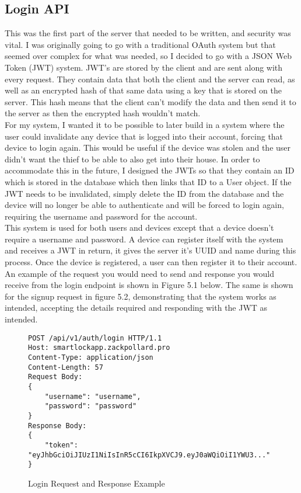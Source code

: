\subsection{Login API}
This was the first part of the server that needed to be written, and security was vital. I was originally going to go with a traditional OAuth system but that seemed over complex for what was needed, so I decided to go with a JSON Web Token (JWT) system. JWT's are stored by the client and are sent along with every request. They contain data that both the client and the server can read, as well as an encrypted hash of that same data using a key that is stored on the server. This hash means that the client can't modify the data and then send it to the server as then the encrypted hash wouldn't match. 
\\
\indent For my system, I wanted it to be possible to later build in a system where the user could invalidate any device that is logged into their account, forcing that device to login again. This would be useful if the device was stolen and the user didn't want the thief to be able to also get into their house. In order to accommodate this in the future, I designed the JWTs so that they contain an ID which is stored in the database which then links that ID to a User object. If the JWT needs to be invalidated, simply delete the ID from the database and the device will no longer be able to authenticate and will be forced to login again, requiring the username and password for the account.
\\
\indent This system is used for both users and devices except that a device doesn't require a username and password. A device can register itself with the system and receives a JWT in return, it gives the server it's UUID and name during this process. Once the device is registered, a user can then register it to their account. An example of the request you would need to send and response you would receive from the login endpoint is shown in Figure 5.1 below. The same is shown for the signup request in figure 5.2, demonstrating that the system works as intended, accepting the details required and responding with the JWT as intended.
\begin{figure}[H]
	\caption{Login Request and Response Example}
		\begin{Verbatim}[frame=single]
POST /api/v1/auth/login HTTP/1.1
Host: smartlockapp.zackpollard.pro
Content-Type: application/json
Content-Length: 57
Request Body:
{
	"username": "username",
	"password": "password"
}
Response Body:
{
	"token": "eyJhbGciOiJIUzI1NiIsInR5cCI6IkpXVCJ9.eyJ0aWQiOiI1YWU3..."
}
		\end{Verbatim}
\end{figure}

